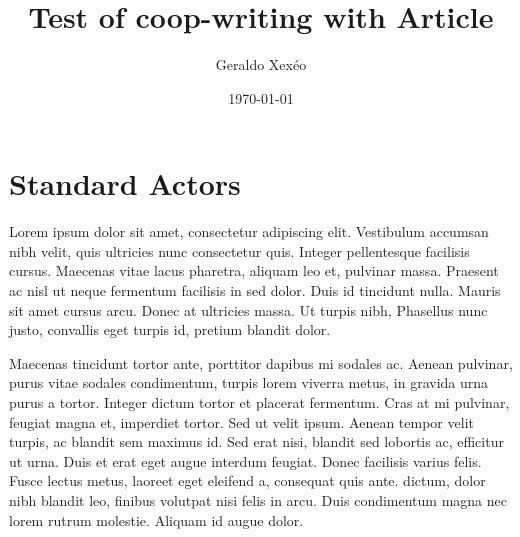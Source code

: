 \documentclass[12pt,a4paper]{article}
\author{Geraldo Xexéo}
\date{\today}
\title{Test of coop-writing with Article}
\begin{document}
\maketitle

\section{Standard Actors}

Lorem ipsum dolor sit \NOME amet, consectetur adipiscing elit. Vestibulum accumsan nibh velit, quis ultricies nunc consectetur  quis. Integer pellentesque facilisis cursus. Maecenas vitae lacus pharetra, aliquam leo et, pulvinar massa. Praesent ac nisl ut neque fermentum facilisis in sed dolor. Duis id tincidunt nulla. Mauris sit amet cursus arcu. Donec at ultricies massa. Ut turpis nibh,  Phasellus nunc justo, convallis eget turpis id, pretium blandit dolor.

Maecenas tincidunt tortor ante, porttitor dapibus mi sodales ac. Aenean pulvinar, purus vitae sodales condimentum, turpis lorem viverra metus, in gravida urna purus a tortor. Integer dictum tortor et placerat fermentum. Cras at mi pulvinar, feugiat magna et, imperdiet tortor. Sed ut velit ipsum. Aenean tempor velit turpis, ac blandit sem maximus id. Sed erat nisi, blandit sed lobortis ac, efficitur ut urna. Duis et erat eget augue interdum feugiat. Donec facilisis varius felis. Fusce lectus metus, laoreet eget eleifend a, consequat quis ante.  dictum, dolor nibh blandit leo, finibus volutpat nisi felis in arcu. Duis condimentum magna nec lorem rutrum molestie. Aliquam id augue dolor.
\end{document}
